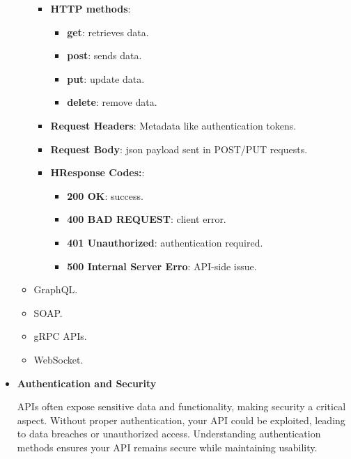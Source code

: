 \begin{itemize}
\begin{itemize}
\begin{itemize}
            \item \textbf{HTTP methods}:
            \begin{itemize}
                \item \textbf{get}: retrieves data.
                \item \textbf{post}: sends data.
                \item \textbf{put}: update data.
                \item \textbf{delete}: remove data.
            \end{itemize}
            
            \item \textbf{Request Headers}: Metadata like authentication
            tokens.

            \item \textbf{Request Body}: json payload sent in POST/PUT requests.            

            \item \textbf{HResponse Codes:}:
            \begin{itemize}
                \item \textbf{200 OK}: success.
                \item \textbf{400 BAD REQUEST}: client error.
                \item \textbf{401 Unauthorized}: authentication required.
                \item \textbf{500 Internal Server Erro}: API-side issue.
            \end{itemize}
        \end{itemize}

        \item GraphQL.
        

        \item SOAP.


        \item gRPC APIs.
        

        \item WebSocket.

    \end{itemize}


    \item \textbf{Authentication and Security}

    \noindent
    APIs often expose sensitive data and functionality, making security
    a critical aspect. Without proper authentication, your API could be
    exploited, leading to data breaches or unauthorized access.
    Understanding authentication methods ensures your API remains secure
    while maintaining usability.


\end{itemize}
